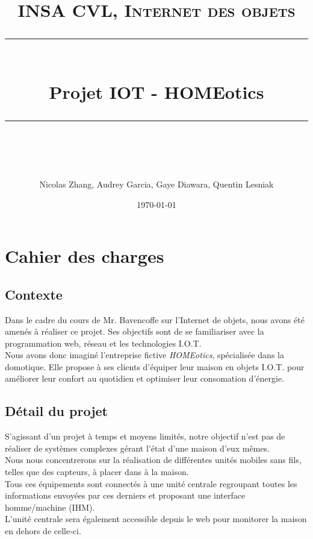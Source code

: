 \documentclass[11pt]{scrartcl} %
\title{	
	\normalfont\normalsize
	\vspace{\fill} %
	\textsc{INSA CVL, Internet des objets}\\ %
	\vspace{25pt} %
	\rule{\linewidth}{0.5pt}\\ %
	\vspace{20pt} %
	{\huge Projet IOT - HOMEotics}\\ %
	\vspace{12pt} %
	\rule{\linewidth}{2pt}\\ %
	\vspace{12pt} %
}
\author{Nicolas Zhang, Audrey Garcia, Gaye Diawara, Quentin Lesniak} %
\date{\normalsize\today\vspace{\fill}} %
\begin{document}
\maketitle %
\newpage


\section{Cahier des charges}

\subsection{Contexte}

Dans le cadre du cours de Mr. Bavencoffe sur l'Internet de objets, nous avons été amenés à réaliser ce projet. Ses objectifs sont de se familiariser avec la programmation web, réseau et les technologies I.O.T.\\
Nous avons donc imaginé l'entreprise fictive \textit{HOMEotics}, spécialisée dans la domotique. Elle propose à ses clients d'équiper leur maison en objets I.O.T. pour améliorer leur confort au quotidien et optimiser leur consomation d'énergie.


\subsection{Détail du projet}

S'agissant d'un projet à temps et moyens limités, notre objectif n'est pas de réaliser de systèmes complexes gérant l'état d'une maison d'eux mêmes.\\
Nous nous concentrerons sur la réalisation de différentes unités mobiles sans fils, telles que des capteurs, à placer dans à la maison.\\
Tous ces équipements sont connectés à une unité centrale regroupant toutes les informations envoyées par ces derniers et proposant une interface homme/machine (IHM).\\
L'unité centrale sera également accessible depuis le web pour monitorer la maison en dehors de celle-ci.

\end{document}
